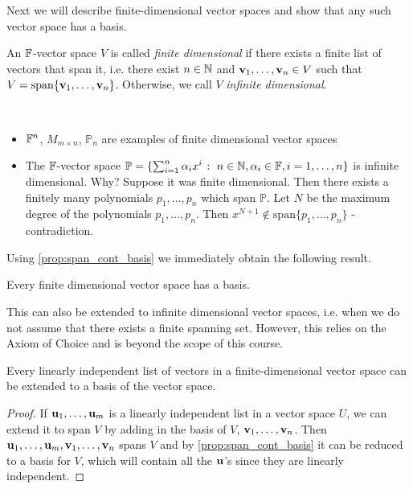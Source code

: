 \documentclass{article}
\begin{document}
Next we will describe finite-dimensional vector spaces and show that any such vector space has a basis.

\begin{definition}
An ${\mathbb{F}}$-vector space $V$ is called \emph{finite dimensional} if there exists a finite list of vectors that span it, i.e. there exist $n\in {\mathbb{N}}$ and ${\mathbf{v}}_1,\ldots, {\mathbf{v}}_n\in V$ such that $V= \mathrm{span}\{{\mathbf{v}}_1,\ldots,{\mathbf{v}}_n\}$. Otherwise, we call $V$ \emph{infinite dimensional}.
\end{definition}

\begin{example}
\textcolor{white}{skip}
\begin{itemize}
    \item ${\mathbb{F}}^n$, $M_{m\times n}$, $\mathbb{P}_n$ are examples of finite dimensional vector spaces
    \item The ${\mathbb{F}}$-vector space $\mathbb{P} = \{ \sum_{i=1}^n \alpha_i x^i  \; \colon \; n\in {\mathbb{N}}, \alpha_i \in {\mathbb{F}}, i=1,\ldots,n\}$ is infinite dimensional. Why? Suppose it was finite dimensional. Then there exists a finitely many polynomials $p_1,\ldots, p_n$ which span $\mathbb{P}$. Let $N$ be the maximum degree of the polynomials $p_1,\ldots, p_n$. Then $x^{N+1} \not\in \mathrm{span}\{p_1,\ldots,p_n\}$ - contradiction.
\end{itemize}
\end{example}

Using \cref{prop:span_cont_basis} we immediately obtain the following result.

\begin{corollary}
Every finite dimensional vector space has a basis.
\end{corollary}

This can also be extended to infinite dimensional vector spaces, i.e. when we do not assume that there exists a finite spanning set. However, this relies on the Axiom of Choice and is beyond the scope of this course.

\begin{proposition}
\label{prop:extendlisttobasis}
Every linearly independent list of vectors in a finite-dimensional vector space can be extended to a basis of the vector space.
\end{proposition}
\begin{proof}
If ${\mathbf{u}}_1, \ldots, {\mathbf{u}}_m$ is a linearly independent list in a vector space $U$, we can extend it to span $V$ by adding in the basis of $V$, ${\mathbf{v}}_1, \ldots, {\mathbf{v}}_n$. Then ${\mathbf{u}}_1, \ldots, {\mathbf{u}}_m,{\mathbf{v}}_1, \ldots, {\mathbf{v}}_n$ spans $V$ and by \cref{prop:span_cont_basis} it can be reduced to a basis for $V$, which will contain all the ${\mathbf{u}}$'s since they are linearly independent.
\end{proof}
\end{document}
